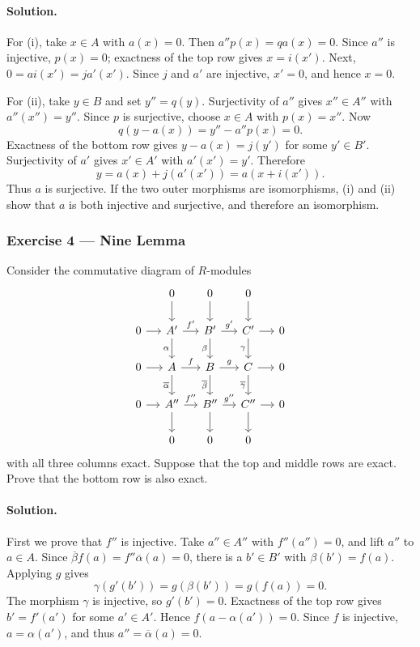 \paragraph{Solution.}
\hypertarget{o014.mastery.diagram-chasing.001.sol03}{ }
For (i), take $x\in A$ with $a(x)=0$. Then
$a''p(x)=qa(x)=0$. Since $a''$ is injective, $p(x)=0$; exactness of the
top row gives $x=i(x')$. Next,
$0=a i(x')=j a'(x')$. Since $j$ and $a'$ are injective, $x'=0$, and hence
$x=0$.

For (ii), take $y\in B$ and set $y''=q(y)$. Surjectivity of $a''$ gives
$x''\in A''$ with $a''(x'')=y''$. Since $p$ is surjective, choose
$x\in A$ with $p(x)=x''$. Now
\[
	q(y-a(x))=y''-a''p(x)=0.
\]
Exactness of the bottom row gives $y-a(x)=j(y')$ for some $y'\in B'$.
Surjectivity of $a'$ gives $x'\in A'$ with $a'(x')=y'$. Therefore
\[
	y=a(x)+j(a'(x'))=a(x+i(x')).
\]
Thus $a$ is surjective. If the two outer morphisms are isomorphisms, (i)
and (ii) show that $a$ is both injective and surjective, and therefore an
isomorphism.

\subsubsection*{Exercise 4 --- Nine Lemma}
\hypertarget{o014.mastery.diagram-chasing.001.ex04}{ }
\label{mastery:diagram-chasing-001-ex04}

Consider the commutative diagram of $R$-modules
\[
\begin{tikzcd}[column sep=small]
	& 0 \arrow[d] & 0 \arrow[d] & 0 \arrow[d] & \\
	0 \arrow[r] & A' \arrow[r, "f'"] \arrow[d, "\alpha"'] & B' \arrow[r, "g'"] \arrow[d, "\beta"'] & C' \arrow[r] \arrow[d, "\gamma"'] & 0 \\
	0 \arrow[r] & A \arrow[r, "f"] \arrow[d, "\overline\alpha"'] & B \arrow[r, "g"] \arrow[d, "\overline\beta"'] & C \arrow[r] \arrow[d, "\overline\gamma"'] & 0 \\
	0 \arrow[r] & A'' \arrow[r, "f''"] \arrow[d] & B'' \arrow[r, "g''"] \arrow[d] & C'' \arrow[r] \arrow[d] & 0 \\
	& 0 & 0 & 0 &
\end{tikzcd}
\]
with all three columns exact. Suppose that the top and middle rows are
exact. Prove that the bottom row is also exact.

\paragraph{Solution.}
\hypertarget{o014.mastery.diagram-chasing.001.sol04}{ }
First we prove that $f''$ is injective. Take $a''\in A''$ with
$f''(a'')=0$, and lift $a''$ to $a\in A$. Since
$\overline\beta f(a)=f''\overline\alpha(a)=0$, there is a $b'\in B'$ with
$\beta(b')=f(a)$. Applying $g$ gives
\[
	\gamma(g'(b'))=g(\beta(b'))=g(f(a))=0.
\]
The morphism $\gamma$ is injective, so $g'(b')=0$. Exactness of the top row
gives $b'=f'(a')$ for some $a'\in A'$. Hence
$f(a-\alpha(a'))=0$. Since $f$ is injective, $a=\alpha(a')$, and thus
$a''=\overline\alpha(a)=0$.


